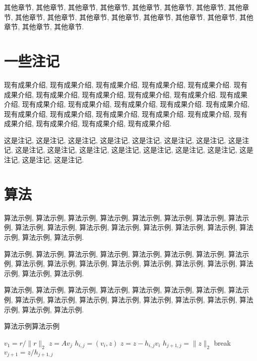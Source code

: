 \documentclass{ecnumaster}
\begin{document}
其他章节, 其他章节, 其他章节, 其他章节, 其他章节, 其他章节,
其他章节, 其他章节, 其他章节, 其他章节, 其他章节, 其他章节,
其他章节, 其他章节, 其他章节, 其他章节, 其他章节, 其他章节.


\section{一些注记}
现有成果介绍, 现有成果介绍, 现有成果介绍, 现有成果介绍, 现有成果介绍.
现有成果介绍, 现有成果介绍, 现有成果介绍, 现有成果介绍, 现有成果介绍.
现有成果介绍, 现有成果介绍, 现有成果介绍, 现有成果介绍, 现有成果介绍.
现有成果介绍, 现有成果介绍, 现有成果介绍, 现有成果介绍, 现有成果介绍.
现有成果介绍, 现有成果介绍, 现有成果介绍, 现有成果介绍, 现有成果介绍.

\begin{remark}
  这是注记, 这是注记, 这是注记, 这是注记, 这是注记, 这是注记,
  这是注记, 这是注记, 这是注记, 这是注记, 这是注记, 这是注记,
  这是注记, 这是注记, 这是注记, 这是注记, 这是注记, 这是注记.
\end{remark}

\section{算法}
算法示例, 算法示例, 算法示例, 算法示例, 算法示例, 算法示例,
算法示例, 算法示例, 算法示例, 算法示例, 算法示例, 算法示例,
算法示例, 算法示例, 算法示例, 算法示例, 算法示例, 算法示例.

算法示例, 算法示例, 算法示例, 算法示例, 算法示例, 算法示例,
算法示例, 算法示例, 算法示例, 算法示例, 算法示例, 算法示例,
算法示例, 算法示例, 算法示例, 算法示例, 算法示例, 算法示例.

算法示例, 算法示例, 算法示例, 算法示例, 算法示例, 算法示例,
算法示例, 算法示例, 算法示例, 算法示例, 算法示例, 算法示例,
算法示例, 算法示例, 算法示例, 算法示例, 算法示例, 算法示例.

\begin{algorithm}[H]
\caption{算法示例算法示例\label{Alg:}}
  \begin{algorithmic}[1]
  \State $v_1 = r/\|r\|_2$
  \State $z = A v_j$
  \State $h_{i,j} = (v_i,z)$  
  \State $z = z - h_{i,j}v_i$
  \EndFor
  \State $h_{j+1,j}=\|z\|_2$
  \State break
  \EndIf
  \State $v_{j+1}=z/h_{j+1,j}$
  \EndFor
  \end{algorithmic}
\end{algorithm}

\clearpage{\pagestyle{empty}\cleardoublepage}
\end{document}
